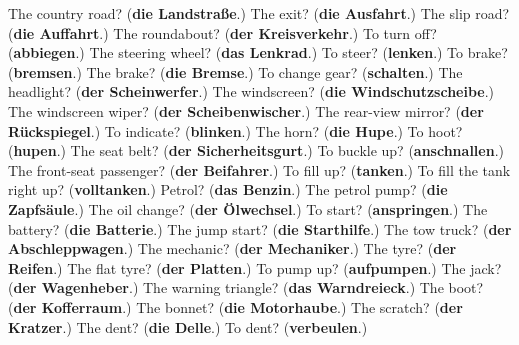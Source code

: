 \begin{tcolorbox}[breakable,colback=teal!4,colframe=teal!35!black,title={Before you move on}]
The country road? (\textbf{die Landstraße}.) The exit? (\textbf{die Ausfahrt}.) The slip road? (\textbf{die Auffahrt}.) The roundabout? (\textbf{der Kreisverkehr}.) To turn off? (\textbf{abbiegen}.) The steering wheel? (\textbf{das Lenkrad}.) To steer? (\textbf{lenken}.) To brake? (\textbf{bremsen}.) The brake? (\textbf{die Bremse}.) To change gear? (\textbf{schalten}.) The headlight? (\textbf{der Scheinwerfer}.) The windscreen? (\textbf{die Windschutzscheibe}.) The windscreen wiper? (\textbf{der Scheibenwischer}.) The rear-view mirror? (\textbf{der Rückspiegel}.) To indicate? (\textbf{blinken}.) The horn? (\textbf{die Hupe}.) To hoot? (\textbf{hupen}.) The seat belt? (\textbf{der Sicherheitsgurt}.) To buckle up? (\textbf{anschnallen}.) The front-seat passenger? (\textbf{der Beifahrer}.) To fill up? (\textbf{tanken}.) To fill the tank right up? (\textbf{volltanken}.) Petrol? (\textbf{das Benzin}.) The petrol pump? (\textbf{die Zapfsäule}.) The oil change? (\textbf{der Ölwechsel}.) To start? (\textbf{anspringen}.) The battery? (\textbf{die Batterie}.) The jump start? (\textbf{die Starthilfe}.) The tow truck? (\textbf{der Abschleppwagen}.) The mechanic? (\textbf{der Mechaniker}.) The tyre? (\textbf{der Reifen}.) The flat tyre? (\textbf{der Platten}.) To pump up? (\textbf{aufpumpen}.) The jack? (\textbf{der Wagenheber}.) The warning triangle? (\textbf{das Warndreieck}.) The boot? (\textbf{der Kofferraum}.) The bonnet? (\textbf{die Motorhaube}.) The scratch? (\textbf{der Kratzer}.) The dent? (\textbf{die Delle}.) To dent? (\textbf{verbeulen}.)
\end{tcolorbox}
